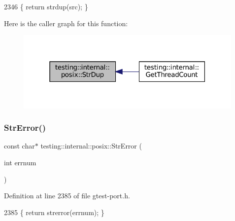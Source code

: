 \begin{DoxyCode}
2346 \{ \textcolor{keywordflow}{return} strdup(src); \}
\end{DoxyCode}
Here is the caller graph for this function\+:
\nopagebreak
\begin{figure}[H]
\begin{center}
\leavevmode
\includegraphics[width=316pt]{namespacetesting_1_1internal_1_1posix_a8e352884793a65ae8be144676f1a9136_icgraph}
\end{center}
\end{figure}
\mbox{\label{namespacetesting_1_1internal_1_1posix_a4b77b14af6f4d18f83d303b98e9349c4}} 
\subsubsection{\texorpdfstring{Str\+Error()}{StrError()}}
{\footnotesize\ttfamily const char$\ast$ testing\+::internal\+::posix\+::\+Str\+Error (\begin{DoxyParamCaption}\item[{int}]{errnum }\end{DoxyParamCaption})\hspace{0.3cm}{\ttfamily [inline]}}



Definition at line 2385 of file gtest-\/port.\+h.


\begin{DoxyCode}
2385 \{ \textcolor{keywordflow}{return} strerror(errnum); \}
\end{DoxyCode}
\mbox{\label{namespacetesting_1_1internal_1_1posix_a36fca815713332e5c6dc92c98b6b2574}} 
